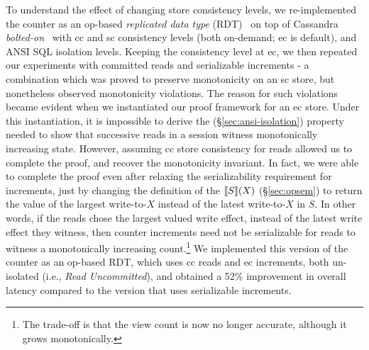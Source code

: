 To understand the effect of changing store consistency levels, we
re-implemented the counter as an op-based \emph{replicated data type}
(RDT)~\cite{crdt,burckhardt14} on top of Cassandra
\emph{bolted-on}~\cite{bailisbolton} with {\sc cc} and {\sc sc}
consistency levels (both on-demand; {\sc ec} is default), and ANSI SQL
isolation levels. Keeping the consistency level at {\sc ec}, we then
repeated our experiments with committed reads and serializable
increments - a combination which was proved to preserve monotonicity
on an {\sc sc} store, but nonetheless observed monotonicity
violations. The reason for such violations became evident when
we instantiated our proof framework for an {\sc ec} store.
Under this instantiation, it is impossible to derive the
 (\S\ref{sec:ansi-isolation}) property needed to show
that successive reads in a session witness monotonically increasing
state. However, assuming {\sc cc} store consistency for reads allowed
us to complete the proof, and recover the monotonicity invariant. In
fact, we were able to complete the proof even after relaxing the
serializability requirement for increments, just by changing the
definition of the $\llbracket S \rrbracket(X)$ (\S\ref{sec:opsem}) to return
the value of the largest write-to-$X$ instead of the latest
write-to-$X$ in $S$.  In other words, if the reads chose the largest
valued write effect, instead of the latest write effect they witness,
then counter increments need not be serializable for reads to witness
a monotonically increasing count.\footnote{The trade-off is that the
view count is now no longer accurate, although it grows
monotonically.} We implemented this version of the counter as an
op-based RDT, which uses {\sc cc} reads and {\sc ec} increments, both
un-isolated (i.e., \emph{Read Uncommitted}), and obtained a 52\%
improvement in overall latency compared to the version that uses
serializable increments.
\vspace*{-3pt}

